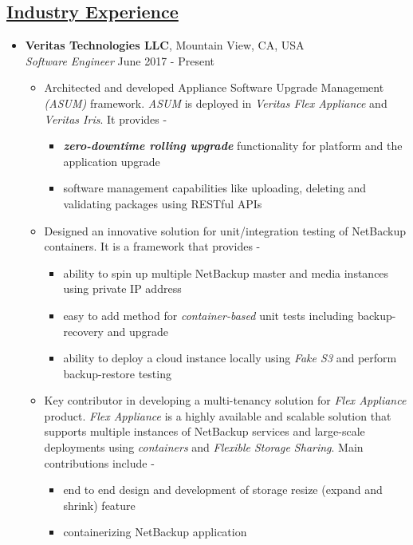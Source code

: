 \documentclass[10pt]{article}
\begin{document}
\subsection*{\underline{Industry Experience}}
\vspace{-0.1cm}
\begin{itemize}[leftmargin=0.15in]
\item {\bfseries Veritas Technologies LLC}, Mountain View, CA, USA \\
{\sl Software Engineer}  \hfill June 2017 - Present
\vspace{-0.15cm}
\begin{itemize}
\setlength{\itemsep}{0.5pt}%
\item Architected and developed Appliance Software Upgrade Management \textit{(ASUM)} framework. \textit{ASUM} is deployed in \textit{Veritas Flex Appliance} and \textit{Veritas Iris}. It provides -
\begin{itemize}
\item \textbf{\textit {zero-downtime rolling upgrade}} functionality for platform and the application upgrade
\item software management capabilities like uploading, deleting and validating packages using RESTful APIs
\end{itemize}

\item Designed an innovative solution for unit/integration testing of NetBackup containers. It is a framework that provides -
\begin{itemize}
\item ability to spin up multiple NetBackup master and media instances using private IP address
\item easy to add method for \textit{container-based} unit tests including backup-recovery and upgrade
\item ability to deploy a cloud instance locally using \textit{Fake S3} and perform backup-restore testing
\end{itemize}
\item Key contributor in developing a multi-tenancy solution for \textit{Flex Appliance} product. \textit{Flex Appliance} is a highly available and scalable solution that supports multiple instances of NetBackup services and large-scale deployments using \textit{containers} and \textit{Flexible Storage Sharing}. Main contributions include -
\begin{itemize}
\item end to end design and development of storage resize (expand and shrink) feature
\item containerizing NetBackup application
\end{itemize}


\end{itemize}
\end{itemize}
\end{document}

